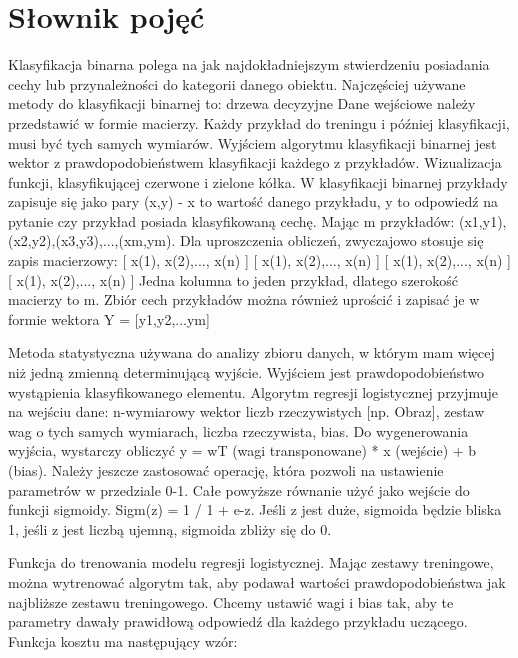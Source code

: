\documentclass[a4paper,twoside,titlepage,openright]{book}
\begin{document}
\chapter*{Słownik pojęć}
\begin{description}[style=nextline]
	\item[Klasyfikacja binarna] Klasyfikacja binarna polega na jak najdokładniejszym stwierdzeniu posiadania cechy lub przynależności do kategorii danego obiektu.
Najczęściej używane metody do klasyfikacji binarnej to: drzewa decyzyjne 
Dane wejściowe należy przedstawić w formie macierzy. Każdy przykład do treningu i później klasyfikacji, musi być tych samych wymiarów. Wyjściem algorytmu klasyfikacji binarnej jest wektor z prawdopodobieństwem klasyfikacji każdego z przykładów. Wizualizacja funkcji, klasyfikującej czerwone i zielone kółka.
W klasyfikacji binarnej przykłady zapisuje się jako pary (x,y) - x to wartość danego przykładu, y to odpowiedź na pytanie czy przykład posiada klasyfikowaną cechę.
Mając m przykładów: {(x1,y1),(x2,y2),(x3,y3),...,(xm,ym)}. Dla uproszczenia obliczeń, zwyczajowo stosuje się zapis macierzowy:
[ x(1), x(2),..., x(n) ]
[ x(1), x(2),..., x(n) ]
[ x(1), x(2),..., x(n) ]
[ x(1), x(2),..., x(n) ]
Jedna kolumna to jeden przykład, dlatego szerokość macierzy to m.
Zbiór cech przykładów można również uprościć i zapisać je w formie wektora Y = [y1,y2,...ym]
	\item[Regresja logistyczna] Metoda statystyczna używana do analizy zbioru danych, w którym mam więcej niż jedną zmienną determinującą wyjście. Wyjściem jest prawdopodobieństwo wystąpienia klasyfikowanego elementu. Algorytm regresji logistycznej przyjmuje na wejściu dane: n-wymiarowy wektor liczb rzeczywistych [np. Obraz], zestaw wag o tych samych wymiarach, liczba rzeczywista, bias.
Do wygenerowania wyjścia, wystarczy obliczyć y = wT (wagi transponowane) * x (wejście) + b (bias). Należy jeszcze zastosować operację, która pozwoli na ustawienie parametrów w przedziale 0-1. Całe powyższe równanie użyć jako wejście do funkcji sigmoidy. Sigm(z) = 1 / 1 + e-z. Jeśli z jest duże, sigmoida będzie bliska 1, jeśli z jest liczbą ujemną, sigmoida zbliży się do 0.
	\item[Funkcja kosztu] Funkcja do trenowania modelu regresji logistycznej. Mając zestawy treningowe, można wytrenować algorytm tak, aby podawał wartości prawdopodobieństwa jak najbliższe zestawu treningowego. Chcemy ustawić wagi i bias tak, aby te parametry dawały prawidłową odpowiedź dla każdego przykładu uczącego. Funkcja kosztu ma następujący wzór:

\end{description}
\end{document}

